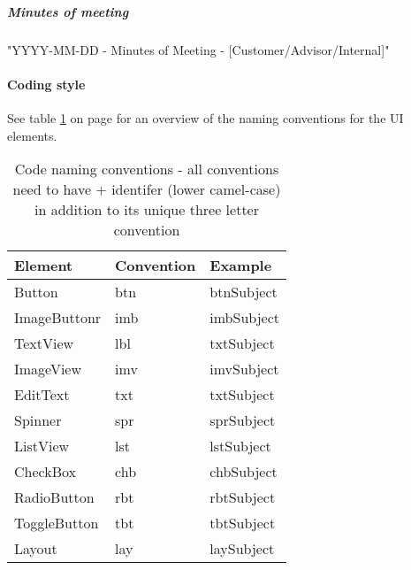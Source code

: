 \subparagraph{Minutes of meeting}\hfill
\newline
"YYYY-MM-DD - Minutes of Meeting - [Customer/Advisor/Internal]"

\paragraph{Coding style}\hfill
\newline
See table \ref{tab:namingconventions} on page \pageref{tab:namingconventions} for an overview of the naming conventions for the UI elements.
\begin{table}
\begin{tabular}{l|l|l} \hline
\textbf{Element} & \textbf{Convention} & \textbf{Example} \\ \hline \hline
Button & btn & btnSubject \\
ImageButtonr & imb & imbSubject \\
TextView & lbl & txtSubject \\
ImageView & imv & imvSubject \\
EditText & txt & txtSubject \\
Spinner & spr & sprSubject \\
ListView & lst & lstSubject \\
CheckBox & chb & chbSubject \\
RadioButton & rbt & rbtSubject \\
ToggleButton & tbt & tbtSubject \\
Layout & lay & laySubject \\ \hline 
\end{tabular}
\caption{Code naming conventions - all conventions need to have + identifer (lower camel-case) in addition to its unique three letter convention }\label{tab:namingconventions}
\end{table}
